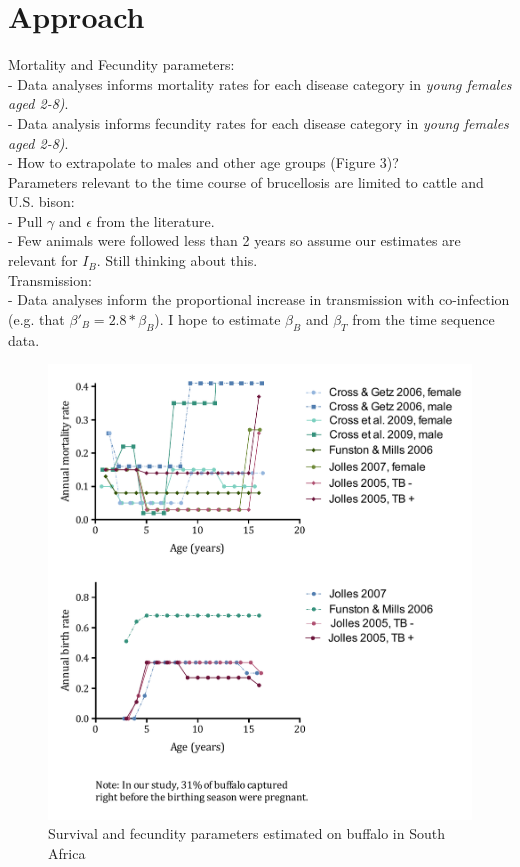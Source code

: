 \documentclass[letterpaper,12pt]{article}
\begin{document}
\section*{Approach}
Mortality and Fecundity parameters: \\
- Data analyses informs mortality rates for each disease category in \textit{young females aged 2-8)}.  \\
- Data analysis informs fecundity rates for each disease category in \textit{young females aged 2-8)}.  \\
- How to extrapolate to males and other age groups (Figure 3)?  \\
Parameters relevant to the time course of brucellosis are limited to cattle and U.S. bison: \\
- Pull $\gamma$ and $\epsilon$ from the literature.  \\
- Few animals were followed less than 2 years so assume our estimates are relevant for $I_B$.  Still thinking about this. \\
Transmission: \\
- Data analyses inform the proportional increase in transmission with co-infection (e.g. that $\beta'_B = 2.8 * \beta_B$).
 I hope to estimate $\beta_B$ and $\beta_T$ from the time sequence data.

\begin{figure}
\begin{center}
\includegraphics[width=5.5in]{Figure3_parametersummary}
\end{center}
\caption{Survival and fecundity parameters estimated on buffalo in South Africa}
\label{fig3}
\end{figure}
\end{document}
